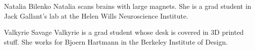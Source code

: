 \documentclass[journal]{IEEEtran}
\begin{document}
% 

\begin{IEEEbiography}{Natalia Bilenko}
Natalia scans brains with large magnets.  She is a grad student in Jack Gallant's lab at the Helen Wills Neuroscience Institute.
\end{IEEEbiography}

\begin{IEEEbiography}{Valkyrie Savage}
Valkyrie is a grad student whose desk is covered in 3D printed stuff.  She works for Bjoern Hartmann in the Berkeley Institute of Design.
\end{IEEEbiography}








\end{document}
